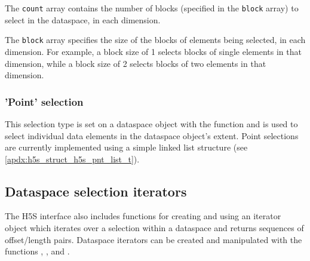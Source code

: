 \documentclass[../HDF5_RFC.tex]{subfiles}
\begin{document}
The \texttt{count} array contains the number of blocks (specified in the \texttt{block}
array) to select in the dataspace, in each dimension.

The \texttt{block} array specifies the size of the blocks of elements being selected,
in each dimension. For example, a block size of 1 selects blocks of single elements in
that dimension, while a block size of 2 selects blocks of two elements in that dimension.

\subsubsection{'Point' selection}

This selection type is set on a dataspace object with the 
function and is used to select individual data elements in the dataspace object's extent.
Point selections are currently implemented using a simple linked list structure (see
\ref{apdx:h5s_struct_h5s_pnt_list_t}).

\subsection{Dataspace selection iterators}

The H5S interface also includes functions for creating and using an iterator object which
iterates over a selection within a dataspace and returns sequences of offset/length pairs.
Dataspace iterators can be created and manipulated with the functions
, ,
 and .
\end{document}
